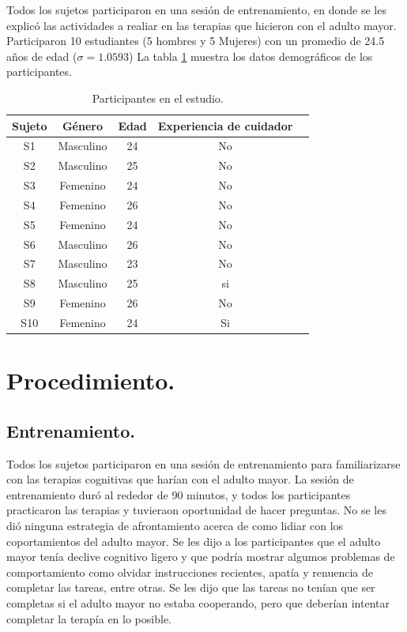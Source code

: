 Todos los sujetos participaron en una sesi\'on de entrenamiento, en donde se les explic\'o las actividades a realiar en las terapias que hicieron con el adulto mayor.
Participaron 10 estudiantes (5 hombres y 5 Mujeres) con un promedio de 24.5 a\~nos de edad ($\sigma=1.0593$) La tabla \ref{table:kysymys} muestra los datos demogr\'aficos de los participantes.

\begin{table}[h]
\centering
\caption{Participantes en el estudio.}
\label{table:kysymys}
\begin{tabular}{|c|c|c|c|c|}
\hline
 \textbf{Sujeto}&  \textbf{G\'enero}&  \textbf{Edad}&  \textbf{Experiencia de cuidador}  \\ \hline
 S1& Masculino & 24 & No   \\ \hline
 S2& Masculino &  25&  No  \\ \hline
 S3& Femenino & 24 & No   \\ \hline
 S4& Femenino & 26 & No  \\ \hline
 S5& Femenino & 24 & No   \\ \hline
 S6& Masculino & 26 &  No  \\ \hline
 S7& Masculino & 23 &  No \\ \hline
 S8& Masculino & 25 &  si  \\ \hline
 S9& Femenino & 26 & No   \\ \hline
 S10& Femenino & 24 & Si  \\ \hline
\end{tabular}
\end{table}
\section{Procedimiento.}\label{secc:methods}
\subsection{Entrenamiento.}\label{secc:training}
Todos los sujetos participaron en una sesi\'on de entrenamiento para familiarizarse con las terapias cognitivas que har\'ian con el adulto mayor. La sesi\'on de entrenamiento dur\'o al rededor de 90 minutos, y todos los participantes practicaron las terapias y tuvieraon oportunidad de hacer preguntas. No se les di\'o ninguna estrategia de afrontamiento acerca de como lidiar con los coportamientos del adulto mayor. Se les dijo a los participantes que el adulto mayor ten\'ia declive cognitivo ligero y que podr\'ia mostrar algumos problemas de comportamiento como olvidar instrucciones recientes, apat\'ia y renuencia de completar las tareas, entre otras. Se les dijo que las tareas no ten\'ian que ser completas si el adulto mayor no estaba cooperando, pero que deber\'ian intentar completar la terap\'ia en lo posible.

